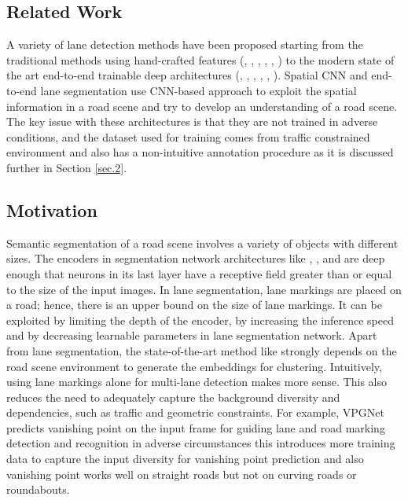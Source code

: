 \documentclass[fleqn,10pt,twocolumn]{ICCAS2019}
\begin{document}
\subsection{Related Work}

A variety of lane detection methods have been proposed starting from the traditional methods using hand-crafted features (\cite{ref1}, \cite{ref2}, \cite{ref3}, \cite{ref4}, \cite{ref5}, \cite{ref6}) to the modern state of the art end-to-end trainable deep architectures (\cite{ref7}, \cite{ref8}, \cite{ref9}, \cite{ref10}, \cite{spcnn}, \cite{te2e}). Spatial CNN \cite{spcnn} and end-to-end lane segmentation \cite{te2e} use CNN-based approach to exploit the spatial information in a road scene and try to develop an understanding of a road scene. The key issue with these architectures is that they are not trained in adverse conditions, and the dataset used for training comes from traffic constrained environment and also has a non-intuitive annotation procedure as it is discussed further in Section \ref{sec.2}.

\subsection{Motivation}

Semantic segmentation of a road scene involves a variety of objects with different sizes. The encoders in segmentation network architectures like \cite{segnet}, \cite{unet}, and \cite{enet} are deep enough that neurons in its last layer have a receptive field greater than or equal to the size of the input images. In lane segmentation, lane markings are placed on a road; hence, there is an upper bound on the size of lane markings. It can be exploited by limiting the depth of the encoder, by increasing the inference speed and by decreasing learnable parameters in lane segmentation network. Apart from lane segmentation, the state-of-the-art method like \cite{te2e} strongly depends on the road scene environment to generate the embeddings for clustering. Intuitively, using lane markings alone for multi-lane detection makes more sense. This also reduces the need to adequately capture the background diversity and dependencies, such as traffic and geometric constraints. For example, VPGNet \cite{samsungr} predicts vanishing point on the input frame for guiding lane and road marking detection and recognition in adverse circumstances this introduces more training data to capture the input diversity for vanishing point prediction and also vanishing point works well on straight roads but not on curving roads or roundabouts.
\end{document}
